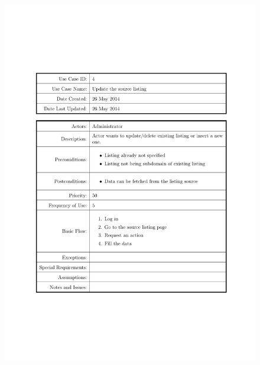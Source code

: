 \documentclass[a4paper]{tufte-book}
\begin{document}
\begin{figure}[h] \includegraphics[width=\linewidth]{Requirements/UseCases/004_SourceListingUpdate.pdf}\end{figure}
\end{document}
